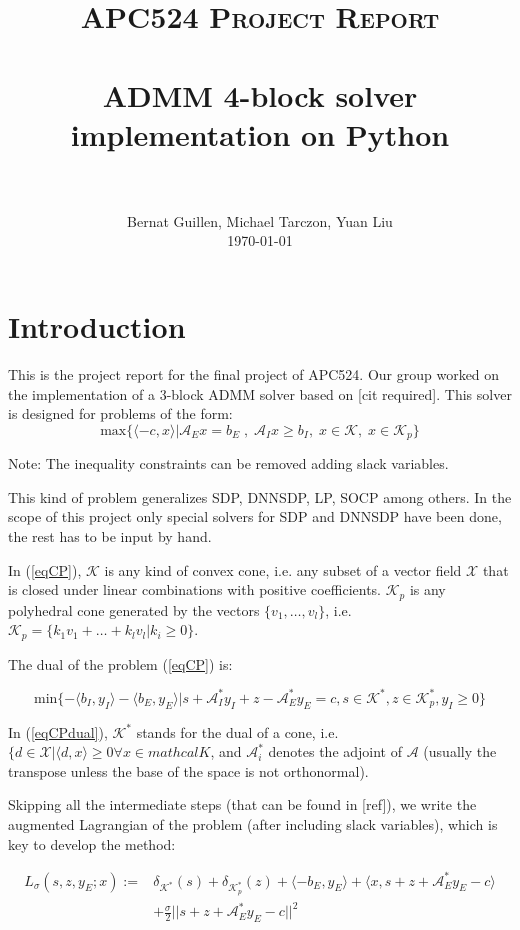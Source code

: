\documentclass[paper=a4, fontsize=11pt]{scrartcl}
\title{
		\usefont{OT1}{bch}{b}{n}
		\normalfont \normalsize \textsc{APC524 Project Report} \\ [25pt]
		\horrule{0.5pt} \\[0.4cm]
		\huge ADMM 4-block solver implementation on Python \\
		\horrule{2pt} \\[0.5cm]
}
\author{
		\normalfont 								\normalsize
        Bernat Guillen, Michael Tarczon, Yuan Liu\\[-3pt]		\normalsize
        \today
}
\date{}
\numberwithin{equation}{section}		%
\numberwithin{figure}{section}			%
\numberwithin{table}{section}				%
\begin{document}
\maketitle
\section{Introduction}
This is the project report for the final project of APC524. Our group worked on the implementation of a 3-block ADMM solver based on [cit required]. This solver is designed for problems of the form:
\begin{equation}
\label{eqCP}
	\text{max}\{\langle -c,x\rangle | \mathcal{A}_E x = b_E\;,\;\mathcal{A}_I x\geq b_I, \;x\in \mathcal{K},\; x\in\mathcal{K}_p\}
\end{equation}

Note: The inequality constraints can be removed adding slack variables.

This kind of problem generalizes SDP, DNNSDP, LP, SOCP among others. In the scope of this project only special solvers for SDP and DNNSDP have been done, the rest has to be input by hand. 

In (\ref{eqCP}), $\mathcal{K}$ is any kind of convex cone, i.e. any subset of a vector field $\mathcal{X}$ that is closed under linear combinations with positive coefficients. $\mathcal{K}_p$ is any polyhedral cone generated by the vectors $\{v_1,\dots,v_l\}$, i.e. $\mathcal{K}_p = \{k_1v_1 + \dots + k_l v_l | k_i \geq 0\}$.

The dual of the problem (\ref{eqCP}) is:

\begin{equation}
\label{eqCPdual}
\text{min}\{-\langle b_I , y_I\rangle -\langle b_E , y_E\rangle | s + \mathcal{A}^{*}_{I} y_I + z - \mathcal{A}^{*}_{E} y_E = c, s\in \mathcal{K}^*, z \in \mathcal{K}_p^*, y_I \geq 0\}
\end{equation}

In (\ref{eqCPdual}), $\mathcal{K}^*$ stands for the dual of a cone, i.e. $\{d \in \mathcal{X} | \langle d,x \rangle \geq 0 \forall x \in mathcal{K}$, and $\mathcal{A}_i^*$ denotes the adjoint of $\mathcal{A}$ (usually the transpose unless the base of the space is not orthonormal). 

Skipping all the intermediate steps (that can be found in [ref]), we write the augmented Lagrangian of the problem (after including slack variables), which is key to develop the method:

\begin{align*}
L_{\sigma} (s,z,y_E;x) := & \delta_{\mathcal{K}^*}(s) + \delta_{\mathcal{K}_p^*}(z) + \langle -b_E,y_E \rangle  + \langle x,s+z+\mathcal{A}_E^* y_E - c\rangle \\
& + \frac{\sigma}{2}||s+z+\mathcal{A}_E^* y_E - c||^2 
\end{align*}
\end{document}
